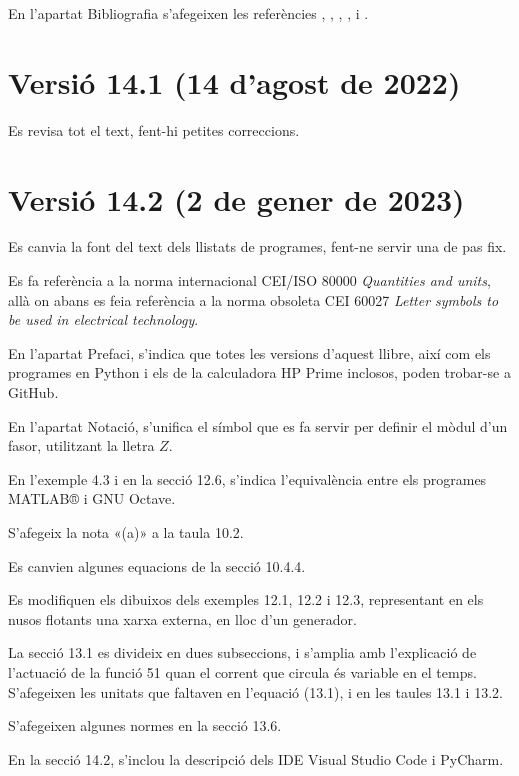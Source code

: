 En l'apartat Bibliografia s'afegeixen les referències \cite{SUM},  \cite{RAM}, \cite{JOH}, \cite{HIL}, \cite{ZUM} i \cite{VAN}.



\section*{Versió 14.1 (14 d'agost de 2022)}

Es revisa tot el text, fent-hi petites correccions.


\section*{Versió 14.2 (2 de gener de 2023)}

Es canvia la font del text dels llistats de programes, fent-ne servir una de pas fix.

Es fa referència a  la norma internacional CEI/ISO 80000 \textit{Quantities and units}, allà on abans es feia referència  a la norma obsoleta CEI 60027 \textit{Letter symbols to be used in electrical technology}.

En l'apartat Prefaci, s'indica que totes les versions d'aquest llibre, així com els programes en Python i els de la calculadora \textsf{HP Prime} inclosos, poden trobar-se a GitHub.

En l'apartat Notació, s'unifica el símbol que es fa servir per definir el mòdul d'un fasor, utilitzant la lletra $Z$.

En l'exemple 4.3 i en la secció  12.6, s'indica l'equivalència entre els programes MATLAB® i GNU Octave.

S'afegeix la nota «(a)» a la taula 10.2.

Es canvien algunes equacions de la secció 10.4.4.

Es modifiquen els dibuixos dels exemples 12.1, 12.2 i 12.3, representant en els nusos flotants una xarxa externa, en lloc d'un generador.

La secció 13.1 es divideix en dues subseccions, i s'amplia amb l'explicació de l'actuació de la funció  51 quan el corrent que circula és variable en el temps. S'afegeixen les unitats que faltaven en l'equació (13.1), i en les taules 13.1 i 13.2.

S'afegeixen algunes normes en la secció 13.6.

En la secció 14.2, s'inclou la descripció dels IDE Visual Studio Code i PyCharm.


